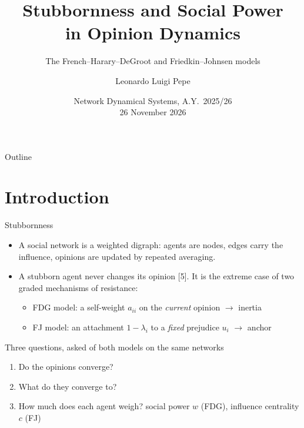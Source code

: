 \documentclass[10pt, aspectratio=169]{beamer}
\title[Stubbornness and social power in opinion dynamics]{Stubbornness and Social Power\\ in Opinion Dynamics}
\subtitle{The French--Harary--DeGroot and Friedkin--Johnsen models}
\author[Leonardo Luigi Pepe]{Leonardo Luigi Pepe}
\date{Network Dynamical Systems, A.Y.\ 2025/26 \\ 26 November 2026}
\begin{document}
\frame{\titlepage}

\begin{frame}{Outline}
  \tableofcontents
\end{frame}

\section{Introduction}

\begin{frame}[label=m-question]{Stubbornness}
  \begin{itemize}
    \item A social network is a weighted digraph: agents are nodes, edges carry the
          influence, opinions are updated by repeated averaging.
    \item A \alert{stubborn} agent never changes its opinion [5]. It is the extreme case of
          two graded mechanisms of resistance:
          \begin{itemize}
            \item FDG model: a \alert{self-weight} $a_{ii}$ on the \emph{current} opinion
                  \hfill $\to$ inertia
            \item FJ model: an \alert{attachment} $1-\lambda_i$ to a \emph{fixed} prejudice
                  $u_i$ \hfill $\to$ anchor
          \end{itemize}
  \end{itemize}
  \vspace{3mm}
  \begin{alertblock}{Three questions, asked of both models on the same networks}
    \begin{enumerate}
      \item Do the opinions converge?
      \item What do they converge to?
      \item How much does each agent weigh? \quad social power $w$ (FDG), influence
            centrality $c$ (FJ)
    \end{enumerate}
  \end{alertblock}
\end{frame}
\end{document}
